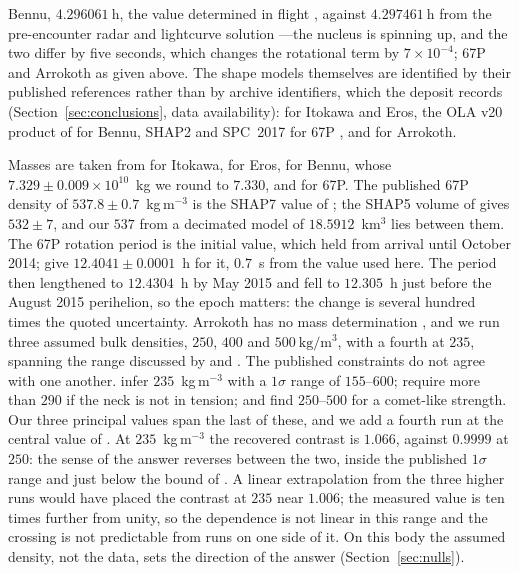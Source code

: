 Bennu, $\SI{4.296061}{\hour}$, the value determined in flight
\citep{hergenrother2019}, against $\SI{4.297461}{\hour}$ from the
pre-encounter radar and lightcurve solution \citep{nolan2013}---the nucleus
is spinning up, and the two differ by five seconds, which changes the
rotational term by $7\times10^{-4}$; 67P and Arrokoth as given above. The
shape models themselves are identified by their published references rather
than by archive identifiers, which the deposit records
(Section~\ref{sec:conclusions}, data availability): \citet{gaskell2008} for
Itokawa and Eros, the OLA v20 product of \citet{barnouin2019} for Bennu,
SHAP2 and SPC~2017 for 67P \citep{preusker2017,jorda2016}, and
\citet{porter2024} for Arrokoth.

Masses are taken from \citet{abe2006} for Itokawa, \citet{yeomans2000}
for Eros, \citet{scheeres2019} for Bennu, whose $7.329\pm0.009\times10^{10}$~kg
we round to $7.330$, and \citet{patzold2016} for 67P. The published 67P
density of $537.8\pm0.7$~kg\,m$^{-3}$ is the SHAP7 value of
\citet{preusker2017}; the SHAP5 volume of \citet{jorda2016} gives
$532\pm7$, and our $537$ from a decimated model of $18.5912$~km$^{3}$ lies
between them. The 67P rotation period is the initial value, which held from
arrival until October 2014; \citet{jorda2016} give $12.4041\pm0.0001$~h for
it, $0.7$~s from the value used here. The period then lengthened to
$12.4304$~h by May 2015 and fell to $12.305$~h just before the August 2015
perihelion, so the epoch matters: the change is several hundred times the
quoted uncertainty.
Arrokoth has no mass determination \citep{spencer2020}, and we run three
assumed bulk densities, $250$, $400$ and
$\SI{500}{\kilo\gram\per\cubic\metre}$, with a fourth at $235$, spanning the range discussed by
\citet{mckinnon2020} and \citet{spencer2020}. The published constraints do not
agree with one another. \citet{keane2022} infer $235$~kg\,m$^{-3}$ with a
$1\sigma$ range of $155$--$600$; \citet{spencer2020} require more than
$290$ if the neck is not in tension; and \citet{mckinnon2020} find
$250$--$500$ for a comet-like strength. Our three principal values span the last
of these, and we add a fourth run at the central value of \citet{keane2022}.
At $235$~kg\,m$^{-3}$ the recovered contrast is $1.066$, against $0.9999$ at
$250$: the sense of the answer reverses between the two, inside the published
$1\sigma$ range and just below the bound of \citet{spencer2020}. A linear
extrapolation from the three higher runs would have placed the contrast at
$235$ near $1.006$; the measured value is ten times further from unity, so the
dependence is not linear in this range and the crossing is not predictable
from runs on one side of it. On this body the assumed density, not the data,
sets the direction of the answer (Section~\ref{sec:nulls}).

